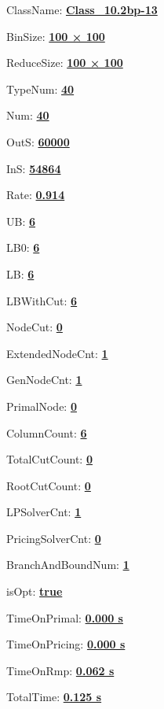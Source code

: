 \documentclass[11pt]{article}
\begin{document}
\pagestyle{empty}


ClassName: \underline{\textbf{Class_10.2bp-13}}
\par
BinSize: \underline{\textbf{100 × 100}}
\par
ReduceSize: \underline{\textbf{100 × 100}}
\par
TypeNum: \underline{\textbf{40}}
\par
Num: \underline{\textbf{40}}
\par
OutS: \underline{\textbf{60000}}
\par
InS: \underline{\textbf{54864}}
\par
Rate: \underline{\textbf{0.914}}
\par
UB: \underline{\textbf{6}}
\par
LB0: \underline{\textbf{6}}
\par
LB: \underline{\textbf{6}}
\par
LBWithCut: \underline{\textbf{6}}
\par
NodeCut: \underline{\textbf{0}}
\par
ExtendedNodeCnt: \underline{\textbf{1}}
\par
GenNodeCnt: \underline{\textbf{1}}
\par
PrimalNode: \underline{\textbf{0}}
\par
ColumnCount: \underline{\textbf{6}}
\par
TotalCutCount: \underline{\textbf{0}}
\par
RootCutCount: \underline{\textbf{0}}
\par
LPSolverCnt: \underline{\textbf{1}}
\par
PricingSolverCnt: \underline{\textbf{0}}
\par
BranchAndBoundNum: \underline{\textbf{1}}
\par
isOpt: \underline{\textbf{true}}
\par
TimeOnPrimal: \underline{\textbf{0.000 s}}
\par
TimeOnPricing: \underline{\textbf{0.000 s}}
\par
TimeOnRmp: \underline{\textbf{0.062 s}}
\par
TotalTime: \underline{\textbf{0.125 s}}
\par
\newpage


\end{document}
